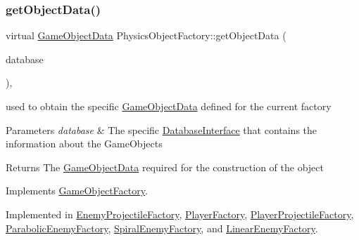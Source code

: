 \mbox{\label{class_physics_object_factory_aa59f52d3adc1fac676f4a8a3c2de9ba9}} 
\subsubsection{\texorpdfstring{get\+Object\+Data()}{getObjectData()}}
{\footnotesize\ttfamily virtual \hyperlink{struct_game_object_data}{Game\+Object\+Data} Physics\+Object\+Factory\+::get\+Object\+Data (\begin{DoxyParamCaption}\item[{const std\+::shared\+\_\+ptr$<$ \hyperlink{class_database_interface}{Database\+Interface} $>$ \&}]{database }\end{DoxyParamCaption})\hspace{0.3cm}{\ttfamily [override]}, {}}



used to obtain the specific \hyperlink{struct_game_object_data}{Game\+Object\+Data} defined for the current factory 


\begin{DoxyParams}{Parameters}
{\em database} & The specific \hyperlink{class_database_interface}{Database\+Interface} that contains the information about the Game\+Objects \\
\hline
\end{DoxyParams}
\begin{DoxyReturn}{Returns}
The \hyperlink{struct_game_object_data}{Game\+Object\+Data} required for the construction of the object 
\end{DoxyReturn}


Implements \hyperlink{class_game_object_factory_ae9358fbb3ef2d3b127320341760d3ff9}{Game\+Object\+Factory}.



Implemented in \hyperlink{class_enemy_projectile_factory_a1ef660e5962f29b7353054c6480477c7}{Enemy\+Projectile\+Factory}, \hyperlink{class_player_factory_aca4e809430541d77acd4c588c4381715}{Player\+Factory}, \hyperlink{class_player_projectile_factory_a702ae964c9dc653140fad4e17f38f60a}{Player\+Projectile\+Factory}, \hyperlink{class_parabolic_enemy_factory_acc62c48a8eb5af162910dc48d9fe8900}{Parabolic\+Enemy\+Factory}, \hyperlink{class_spiral_enemy_factory_a230709a0781c4364aa062b0bd441ec4d}{Spiral\+Enemy\+Factory}, and \hyperlink{class_linear_enemy_factory_a9d959b8a414e30ad4813d5d3740eafee}{Linear\+Enemy\+Factory}.



